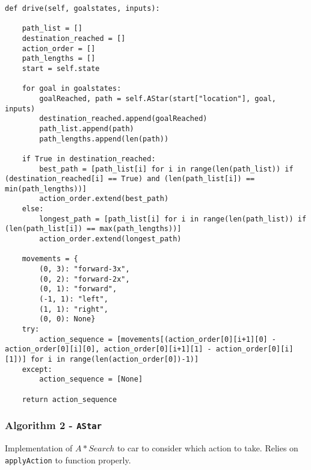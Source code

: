 \documentclass[12pt, letterpaper]{article}
\begin{document}
\begin{mdframed}[backgroundcolor=shadecolor]
\begin{verbatim}
def drive(self, goalstates, inputs):    
    
    path_list = []
    destination_reached = []
    action_order = []
    path_lengths = []
    start = self.state

    for goal in goalstates:
        goalReached, path = self.AStar(start["location"], goal, inputs)
        destination_reached.append(goalReached)
        path_list.append(path)
        path_lengths.append(len(path))
    
    if True in destination_reached:        
        best_path = [path_list[i] for i in range(len(path_list)) if (destination_reached[i] == True) and (len(path_list[i]) == min(path_lengths))]
        action_order.extend(best_path)
    else:        
        longest_path = [path_list[i] for i in range(len(path_list)) if (len(path_list[i]) == max(path_lengths))]
        action_order.extend(longest_path)

    movements = {
        (0, 3): "forward-3x", 
        (0, 2): "forward-2x", 
        (0, 1): "forward", 
        (-1, 1): "left", 
        (1, 1): "right", 
        (0, 0): None}
    try:
        action_sequence = [movements[(action_order[0][i+1][0] - action_order[0][i][0], action_order[0][i+1][1] - action_order[0][i][1])] for i in range(len(action_order[0])-1)]
    except:
        action_sequence = [None]
    
    return action_sequence
\end{verbatim}
\end{mdframed}

\subsubsection{Algorithm 2 - \texttt{AStar}}

Implementation of $A* Search$ to car to consider which action to take. Relies on \texttt{applyAction} to function properly.
\end{document}
